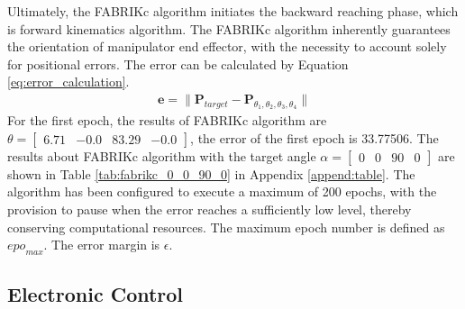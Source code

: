 Ultimately, the FABRIKc algorithm initiates the backward reaching phase, which is forward kinematics algorithm. The 
FABRIKc algorithm inherently guarantees the orientation of manipulator end effector,  with the necessity to account 
solely for positional errors. The error can be calculated by Equation \ref{eq:error_calculation}.
\begin{align}
    \textbf{e} = \lVert\textbf{P}_{target} - \textbf{P}_{\theta_1, \theta_2, \theta_3, \theta_4}\rVert
    \label{eq:error_calculation}
\end{align}
For the first epoch, the results of FABRIKc algorithm are $\theta = \begin{bmatrix} 6.71 & -0.0 & 83.29 & -0.0 
\end{bmatrix} $, the error of the first epoch is 33.77506. The results about FABRIKc algorithm with the target angle 
$\alpha = \begin{bmatrix} 0 & 0 & 90 & 0 \end{bmatrix} $ are shown in Table \ref{tab:fabrikc_0_0_90_0} 
in Appendix \ref{append:table}. The algorithm has been configured to execute a maximum of 200 epochs, with 
the provision to pause when the error reaches a sufficiently low level, thereby conserving computational resources. 
The maximum epoch number is defined as ${epo}_{max}$. The error margin is $\epsilon$.

\subsection{Electronic Control}
